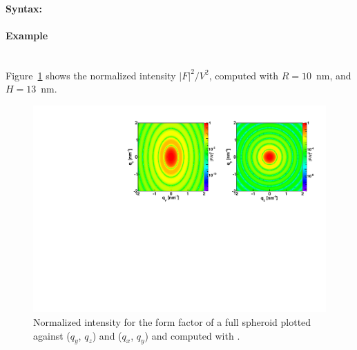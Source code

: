 \paragraph{Syntax:} 
\newpage

\paragraph{Example}\mbox{}\\
Figure~\ref{fig:FFfspheroidEx} shows the normalized intensity
$|F|^2/V^2$, computed with $R=10$~nm, and $H=13$~nm.
\begin{figure}[h]
\begin{center}
\includegraphics[width=\textwidth]{Figures/figfffspheroid}
\end{center}
\caption{Normalized intensity for the form factor of a full spheroid plotted against ($q_y$, $q_z$) and ($q_x$, $q_y$) and
  computed with .}
\label{fig:FFfspheroidEx}
\end{figure}



